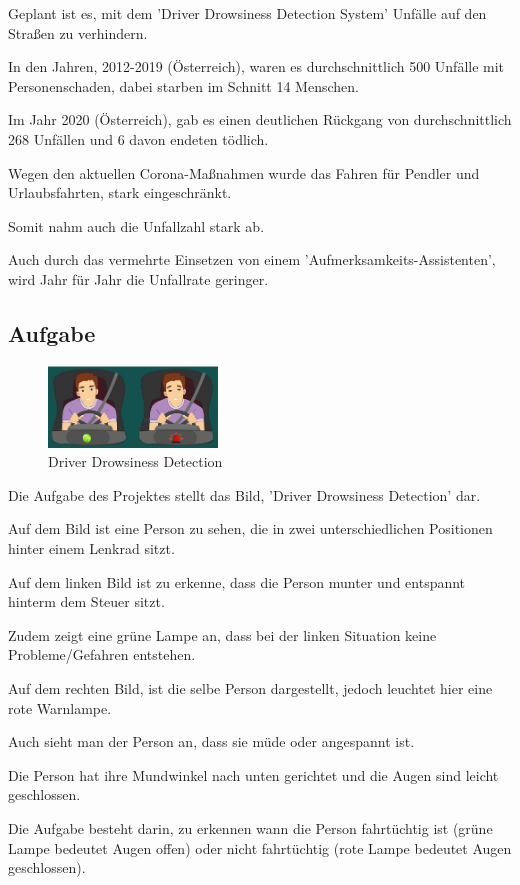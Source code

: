 Geplant ist es, mit dem 'Driver Drowsiness Detection System' Unfälle auf den Straßen zu verhindern.

In den Jahren, 2012-2019 (Österreich), waren es durchschnittlich 500 Unfälle mit Personenschaden, 
dabei starben im Schnitt 14 Menschen.

Im Jahr 2020 (Österreich), gab es einen deutlichen Rückgang von durchschnittlich 268 Unfällen und 6 davon endeten tödlich. 

Wegen den aktuellen Corona-Maßnahmen wurde das Fahren für Pendler und Urlaubsfahrten, stark eingeschränkt. 

Somit nahm auch die Unfallzahl stark ab.

Auch durch das vermehrte Einsetzen von einem 'Aufmerksamkeits-Assistenten', wird Jahr für Jahr die Unfallrate geringer.\cite{b6}

\subsection{Aufgabe}

\begin{figure}[htbp]
  \centering
     \includegraphics[width=0.40\textwidth]{Fahrer.png}
     \caption{Driver Drowsiness Detection}
\end{figure}

Die Aufgabe des Projektes stellt das Bild, 'Driver Drowsiness Detection' dar.

Auf dem Bild ist eine Person zu sehen, die in zwei unterschiedlichen Positionen hinter einem Lenkrad sitzt.

Auf dem linken Bild ist zu erkenne, dass die Person munter und entspannt hinterm dem Steuer sitzt.

Zudem zeigt eine grüne Lampe an, dass bei der linken Situation keine Probleme/Gefahren entstehen.

Auf dem rechten Bild, ist die selbe Person dargestellt, jedoch leuchtet hier eine rote Warnlampe.

Auch sieht man der Person an, dass sie müde oder angespannt ist.

Die Person hat ihre Mundwinkel nach unten gerichtet und die Augen sind leicht geschlossen.

Die Aufgabe besteht darin, zu erkennen wann die Person fahrtüchtig ist (grüne Lampe bedeutet Augen offen) oder nicht fahrtüchtig (rote Lampe bedeutet Augen geschlossen).



